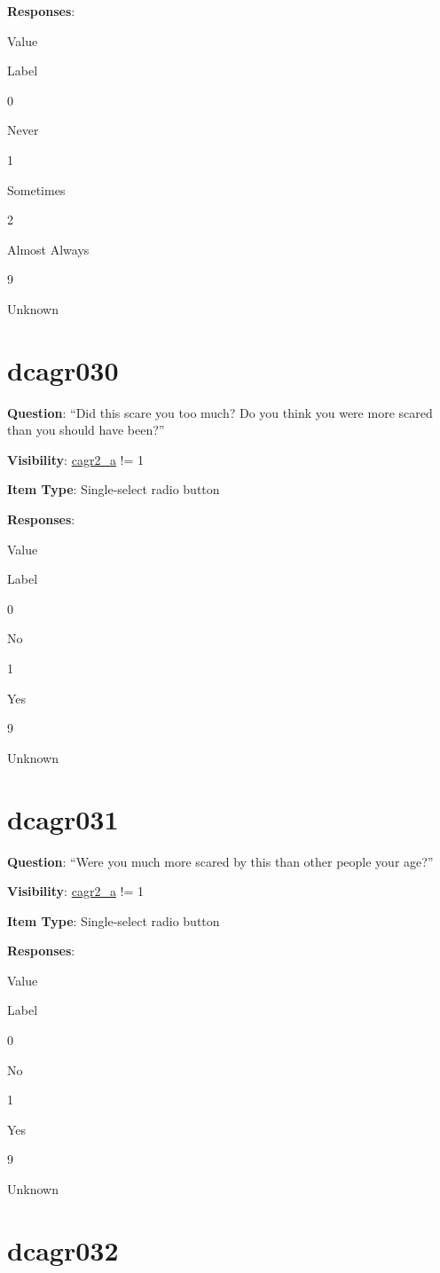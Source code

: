 \documentclass[]{book}
\begin{document}
\textbf{Responses}:

Value

Label

0

Never

1

Sometimes

2

Almost Always

9

Unknown

\hypertarget{dcagr030}{%
\section{dcagr030}\label{dcagr030}}

\textbf{Question}: ``Did this scare you too much? Do you think you were more scared than you should have been?''

\textbf{Visibility}: \protect\hyperlink{cagr2_a}{cagr2\_a} != 1

\textbf{Item Type}: Single-select radio button

\textbf{Responses}:

Value

Label

0

No

1

Yes

9

Unknown

\hypertarget{dcagr031}{%
\section{dcagr031}\label{dcagr031}}

\textbf{Question}: ``Were you much more scared by this than other people your age?''

\textbf{Visibility}: \protect\hyperlink{cagr2_a}{cagr2\_a} != 1

\textbf{Item Type}: Single-select radio button

\textbf{Responses}:

Value

Label

0

No

1

Yes

9

Unknown

\hypertarget{dcagr032}{%
\section{dcagr032}\label{dcagr032}}
\end{document}
